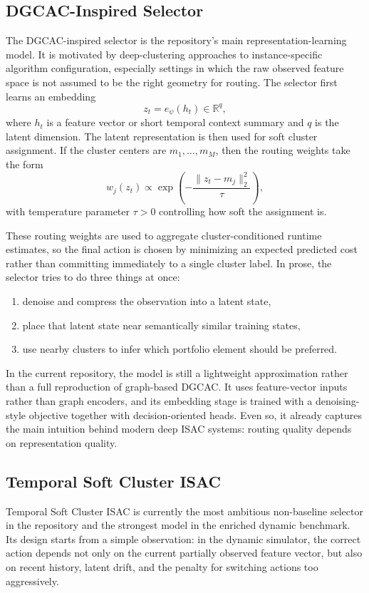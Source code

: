 \documentclass[11pt]{report}
\begin{document}
\subsection{DGCAC-Inspired Selector}

The DGCAC-inspired selector is the repository's main representation-learning model. It is motivated by deep-clustering approaches to instance-specific algorithm configuration, especially settings in which the raw observed feature space is not assumed to be the right geometry for routing. The selector first learns an embedding
\[
z_t = e_\psi(h_t) \in \mathbb{R}^q,
\]
where $h_t$ is a feature vector or short temporal context summary and $q$ is the latent dimension. The latent representation is then used for soft cluster assignment. If the cluster centers are $m_1,\dots,m_M$, then the routing weights take the form
\[
w_j(z_t) \propto \exp\!\left(-\frac{\lVert z_t - m_j\rVert_2^2}{\tau}\right),
\]
with temperature parameter $\tau > 0$ controlling how soft the assignment is.

These routing weights are used to aggregate cluster-conditioned runtime estimates, so the final action is chosen by minimizing an expected predicted cost rather than committing immediately to a single cluster label. In prose, the selector tries to do three things at once:
\begin{enumerate}[leftmargin=2em]
\item denoise and compress the observation into a latent state,
\item place that latent state near semantically similar training states,
\item use nearby clusters to infer which portfolio element should be preferred.
\end{enumerate}

In the current repository, the model is still a lightweight approximation rather than a full reproduction of graph-based DGCAC. It uses feature-vector inputs rather than graph encoders, and its embedding stage is trained with a denoising-style objective together with decision-oriented heads. Even so, it already captures the main intuition behind modern deep ISAC systems: routing quality depends on representation quality.

\subsection{Temporal Soft Cluster ISAC}

Temporal Soft Cluster ISAC is currently the most ambitious non-baseline selector in the repository and the strongest model in the enriched dynamic benchmark. Its design starts from a simple observation: in the dynamic simulator, the correct action depends not only on the current partially observed feature vector, but also on recent history, latent drift, and the penalty for switching actions too aggressively.
\end{document}
